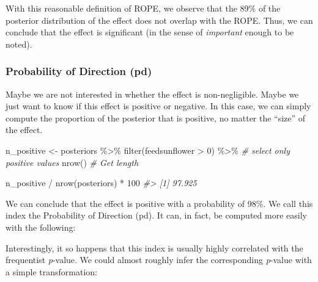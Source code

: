 \documentclass[10pt,a4paper,onecolumn]{article}
\newenvironment{Shaded}{\begin{snugshade}}{\end{snugshade}}
\newcommand{\CommentTok}[1]{\textcolor[rgb]{0.56,0.35,0.01}{\textit{#1}}}
\newcommand{\DecValTok}[1]{\textcolor[rgb]{0.00,0.00,0.81}{#1}}
\newcommand{\FunctionTok}[1]{\textcolor[rgb]{0.00,0.00,0.00}{#1}}
\newcommand{\NormalTok}[1]{#1}
\newcommand{\OtherTok}[1]{\textcolor[rgb]{0.56,0.35,0.01}{#1}}
\newcommand{\SpecialCharTok}[1]{\textcolor[rgb]{0.00,0.00,0.00}{#1}}
\begin{document}
With this reasonable definition of ROPE, we observe that the 89\% of the
posterior distribution of the effect does not overlap with the ROPE.
Thus, we can conclude that the effect is significant (in the sense of
\emph{important} enough to be noted).

\hypertarget{probability-of-direction-pd}{%
\subsubsection{Probability of Direction
(pd)}\label{probability-of-direction-pd}}

Maybe we are not interested in whether the effect is non-negligible.
Maybe we just want to know if this effect is positive or negative. In
this case, we can simply compute the proportion of the posterior that is
positive, no matter the ``size'' of the effect.

\begin{Shaded}
\begin{Highlighting}[]
\NormalTok{n\_positive }\OtherTok{\textless{}{-}}\NormalTok{ posteriors }\SpecialCharTok{\%\textgreater{}\%}
  \FunctionTok{filter}\NormalTok{(feedsunflower }\SpecialCharTok{\textgreater{}} \DecValTok{0}\NormalTok{) }\SpecialCharTok{\%\textgreater{}\%} \CommentTok{\# select only positive values}
  \FunctionTok{nrow}\NormalTok{() }\CommentTok{\# Get length}

\NormalTok{n\_positive }\SpecialCharTok{/} \FunctionTok{nrow}\NormalTok{(posteriors) }\SpecialCharTok{*} \DecValTok{100}
\CommentTok{\#\textgreater{} [1] 97.925}
\end{Highlighting}
\end{Shaded}

We can conclude that the effect is positive with a probability of 98\%.
We call this index the Probability of Direction (pd). It can, in fact,
be computed more easily with the following:

\begin{Shaded}
\end{Shaded}

Interestingly, it so happens that this index is usually highly
correlated with the frequentist \emph{p}-value. We could almost roughly
infer the corresponding \emph{p}-value with a simple transformation:
\end{document}
